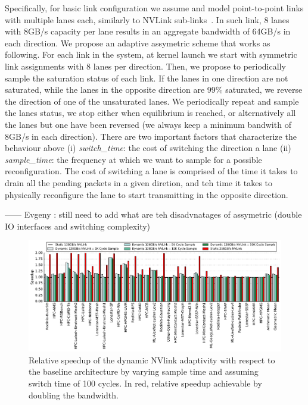 Specifically, for basic link configuration we assume and model point-to-point
links with multiple lanes each, similarly to NVLink
sub-links~\cite{pascal-tesla-wp}.  In such link, 8 lanes with 8GB/s capacity
per lane results in an aggregate bandwidth of 64GB/s in each direction. We
propose an adaptive assymetric scheme that works as following. For each link
in the system, at kernel launch we start with symmetric link assignments with 8
lanes per direction. Then, we propose to periodically sample the saturation
status of each link. If the lanes in one direction are not saturated, while the
lanes in the opposite direction are 99\% saturated, we reverse the direction of
one of the unsaturated lanes. We periodically repeat and sample the lanes
status, we stop either when equilibrium is reached, or alternatively all the lanes but one
have been reversed (we always keep a minimum bandwith of 8GB/s in each
direction).  
There are two important factors that characterize the
behaviour above (i) \emph{switch\_time}: the cost of switching the direction a
lane (ii) \emph{sample\_time}: the frequency at which we want to sample for a
possible reconfiguration. The cost of switching a lane is comprised of the time
it takes to drain all the pending packets in a given diretion, and teh time it
takes to physically reconfigure the lane to start transmitting in the opposite
direction.

------  Evgeny : still need to add what are teh disadvnatages of assymetric
(double IO interfaces and switching complexity)

\begin{figure}[tp]
    \centering
    \includegraphics[width=1.0\textwidth]{figures/plot_nvlink_sample_time.pdf}
    \caption{Relative speedup of the dynamic NVlink adaptivity with respect to
	the baseline architecture by varying sample time and assuming switch time of
	100 cycles. In red, relative speedup achievable by doubling the bandwidth.}
    \label{fig:sampletime}
\end{figure}


